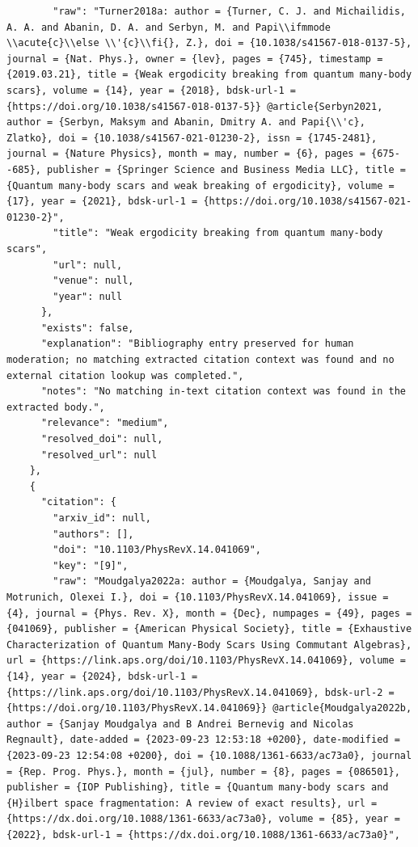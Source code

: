 \documentclass[11pt]{article}
\begin{document}
\begin{verbatim}
        "raw": "Turner2018a: author = {Turner, C. J. and Michailidis, A. A. and Abanin, D. A. and Serbyn, M. and Papi\\ifmmode \\acute{c}\\else \\'{c}\\fi{}, Z.}, doi = {10.1038/s41567-018-0137-5}, journal = {Nat. Phys.}, owner = {lev}, pages = {745}, timestamp = {2019.03.21}, title = {Weak ergodicity breaking from quantum many-body scars}, volume = {14}, year = {2018}, bdsk-url-1 = {https://doi.org/10.1038/s41567-018-0137-5}} @article{Serbyn2021, author = {Serbyn, Maksym and Abanin, Dmitry A. and Papi{\\'c}, Zlatko}, doi = {10.1038/s41567-021-01230-2}, issn = {1745-2481}, journal = {Nature Physics}, month = may, number = {6}, pages = {675--685}, publisher = {Springer Science and Business Media LLC}, title = {Quantum many-body scars and weak breaking of ergodicity}, volume = {17}, year = {2021}, bdsk-url-1 = {https://doi.org/10.1038/s41567-021-01230-2}",
        "title": "Weak ergodicity breaking from quantum many-body scars",
        "url": null,
        "venue": null,
        "year": null
      },
      "exists": false,
      "explanation": "Bibliography entry preserved for human moderation; no matching extracted citation context was found and no external citation lookup was completed.",
      "notes": "No matching in-text citation context was found in the extracted body.",
      "relevance": "medium",
      "resolved_doi": null,
      "resolved_url": null
    },
    {
      "citation": {
        "arxiv_id": null,
        "authors": [],
        "doi": "10.1103/PhysRevX.14.041069",
        "key": "[9]",
        "raw": "Moudgalya2022a: author = {Moudgalya, Sanjay and Motrunich, Olexei I.}, doi = {10.1103/PhysRevX.14.041069}, issue = {4}, journal = {Phys. Rev. X}, month = {Dec}, numpages = {49}, pages = {041069}, publisher = {American Physical Society}, title = {Exhaustive Characterization of Quantum Many-Body Scars Using Commutant Algebras}, url = {https://link.aps.org/doi/10.1103/PhysRevX.14.041069}, volume = {14}, year = {2024}, bdsk-url-1 = {https://link.aps.org/doi/10.1103/PhysRevX.14.041069}, bdsk-url-2 = {https://doi.org/10.1103/PhysRevX.14.041069}} @article{Moudgalya2022b, author = {Sanjay Moudgalya and B Andrei Bernevig and Nicolas Regnault}, date-added = {2023-09-23 12:53:18 +0200}, date-modified = {2023-09-23 12:54:08 +0200}, doi = {10.1088/1361-6633/ac73a0}, journal = {Rep. Prog. Phys.}, month = {jul}, number = {8}, pages = {086501}, publisher = {IOP Publishing}, title = {Quantum many-body scars and {H}ilbert space fragmentation: A review of exact results}, url = {https://dx.doi.org/10.1088/1361-6633/ac73a0}, volume = {85}, year = {2022}, bdsk-url-1 = {https://dx.doi.org/10.1088/1361-6633/ac73a0}",

\end{verbatim}
\end{document}
